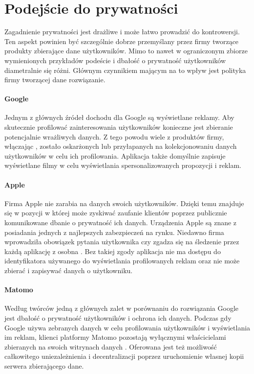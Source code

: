 \section{Podejście do prywatności}
Zagadnienie prywatności jest drażliwe i może łatwo prowadzić do kontrowersji. Ten aspekt powinien być szczególnie dobrze przemyślany przez firmy tworzące produkty zbierające dane użytkowników. Mimo to nawet w ograniczonym zbiorze wymienionych przykładów podeście i dbałość o prywatność użytkowników diametralnie się różni. Głównym czynnikiem mającym na to wpływ jest polityka firmy tworzącej dane rozwiązanie.

\paragraph{Google}
Jednym z głównych źródeł dochodu dla Google są wyświetlane reklamy. Aby skutecznie profilować zainteresowania użytkowników konieczne jest zbieranie potencjalnie wrażliwych danych. Z tego powodu wiele z produktów firmy, włączając , zostało oskarżonych lub przyłapanych na kolekcjonowaniu danych użytkowników w celu ich profilowania. Aplikacja  także domyślnie zapisuje wyświetlane filmy w celu wyświetlania spersonalizowanych propozycji i reklam.

\paragraph{Apple}
Firma Apple nie zarabia na danych swoich użytkowników. Dzięki temu znajduje się w pozycji w której może zyskiwać zaufanie klientów poprzez publicznie komunikowane dbanie o prywatność ich danych. Urządzenia Apple są znane z posiadania jednych z najlepszych zabezpieczeń na rynku. Niedawno firma wprowadziła obowiązek pytania użytkownika czy zgadza się na śledzenie przez każdą aplikację z osobna \cite{Apple_Ad_Transparency}. Bez takiej zgody aplikacja nie ma dostępu do identyfikatora używanego do wyświetlania profilowanych reklam oraz nie może zbierać i zapisywać danych o użytkowniku.

\paragraph{Matomo}
Według twórców jedną z głównych zalet  w porównaniu do rozwiązania Google jest dbałość o prywatność użytkowników i ochrona ich danych. Podczas gdy Google używa zebranych danych w celu profilowania użytkowników i wyświetlania im reklam, klienci platformy Matomo pozostają wyłącznymi właścicielami zbieranych na swoich witrynach danych \cite{Matomo_Data}. Oferowana jest też możliwość całkowitego uniezależnienia i decentralizacji poprzez uruchomienie własnej kopii serwera zbierającego dane.

